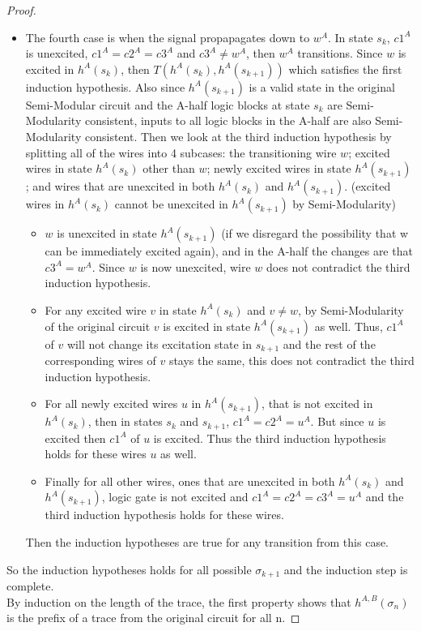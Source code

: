 \documentclass[12pt]{report}
\begin{document}
\begin{proof}
\begin{itemize}
\item The fourth case is when the signal propapagates down to $w^A$.  In state $s_k$, $c1^A$ is unexcited, $c1^A=c2^A=c3^A$ and $c3^A\neq w^A$, then $w^A$ transitions.  Since $w$ is excited in $h^A(s_k)$, then $T(h^A(s_k), h^A(s_{k+1}))$ which satisfies the first induction hypothesis.  Also since $h^A(s_{k+1})$ is a valid state in the original Semi-Modular circuit and the A-half logic blocks at state $s_k$ are Semi-Modularity consistent, inputs to all logic blocks in the A-half are also Semi-Modularity consistent. Then we look at the third induction hypothesis by splitting all of the wires into 4 subcases: the transitioning wire $w$; excited wires in state $h^A(s_k)$ other than $w$; newly excited wires in state $h^A(s_{k+1})$; and wires that are unexcited in both $h^A(s_k)$ and $h^A(s_{k+1})$.  (excited wires in $h^A(s_k)$ cannot be unexcited in $h^A(s_{k+1})$ by Semi-Modularity)  
\begin{itemize}
\item
$w$ is unexcited in state $h^A(s_{k+1})$ (if we disregard the possibility that w can be immediately excited again), and in the A-half the changes are that $c3^{A}= w^{A}$.  Since $w$ is now unexcited, wire $w$ does not contradict the third induction hypothesis.  
\item
For any excited wire $v$ in state $h^A(s_k)$ and $v\neq w$, by Semi-Modularity of the original circuit $v$ is excited in state $h^A(s_{k+1})$ as well.  Thus, $c1^A$ of $v$ will not change its excitation state in $s_{k+1}$ and the rest of the corresponding wires of $v$ stays the same, this does not contradict the third induction hypothesis.  
\item
For all newly excited wires $u$ in $h^A(s_{k+1})$, that is not excited in $h^A(s_k)$, then in states $s_{k}$ and $s_{k+1}$,  $c1^A=c2^A=u^A$.  But since $u$ is excited then $c1^A$ of $u$ is excited.  Thus the third induction hypothesis holds for these wires $u$ as well.  
\item
Finally for all other wires, ones that are unexcited in both $h^A(s_k)$ and $h^A(s_{k+1})$, logic gate is not excited and $c1^A=c2^A=c3^A=u^A$ and the third induction hypothesis holds for these wires.  
\end{itemize}
Then the induction hypotheses are true for any transition from this case. 
\end{itemize}
So the induction hypotheses holds for all possible $\sigma_{k+1}$ and the induction step is complete. \\
By induction on the length of the trace, the first property shows that $h^{A,B}(\sigma_n)$ is the prefix of a trace from the original circuit for all n.


\end{proof}
\end{document}
